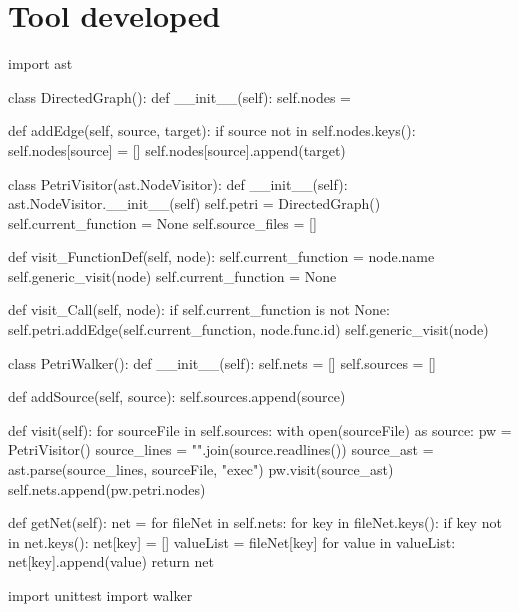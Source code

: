 \documentclass{tufte-handout}
\begin{document}
\newpage
\section{Tool developed}
import ast

class DirectedGraph():
    def __init__(self):
        self.nodes = {}

    def addEdge(self, source, target):
        if source not in self.nodes.keys():
            self.nodes[source] = []
        self.nodes[source].append(target)

class PetriVisitor(ast.NodeVisitor):
    def __init__(self):
        ast.NodeVisitor.__init__(self)
        self.petri = DirectedGraph()
        self.current_function = None
        self.source_files = []

    def visit_FunctionDef(self, node):
        self.current_function = node.name
        self.generic_visit(node)
        self.current_function = None

    def visit_Call(self, node):
        if self.current_function is not None: self.petri.addEdge(self.current_function, node.func.id)
        self.generic_visit(node)

class PetriWalker():
    def __init__(self):
        self.nets = []
        self.sources = []

    def addSource(self, source):
        self.sources.append(source)

    def visit(self):
        for sourceFile in self.sources:
            with open(sourceFile) as source:
                pw = PetriVisitor()
                source_lines = "\n".join(source.readlines())
                source_ast = ast.parse(source_lines, sourceFile, "exec")
                pw.visit(source_ast)
                self.nets.append(pw.petri.nodes)

    def getNet(self):
        net = {}
        for fileNet in self.nets:
            for key in fileNet.keys():
                if key not in net.keys():
                    net[key] = []
                valueList = fileNet[key]
                for value in valueList:
                    net[key].append(value)
        return net

\newpage
{}
import unittest
import walker
\end{document}
